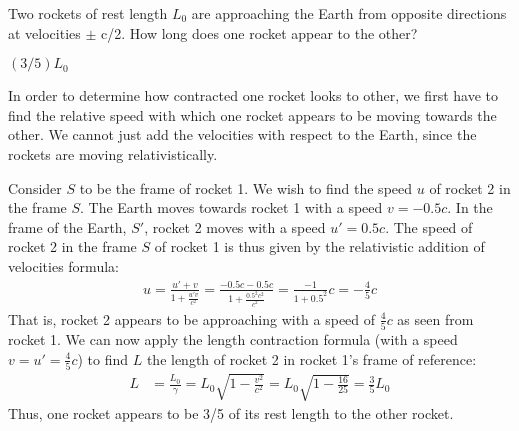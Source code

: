 \question Two rockets of rest length $L_0$ are approaching the Earth from opposite directions at velocities $\pm$ c/2.  How long does one rocket appear to the other?
\begin{finalanswer}
$(3/5)L_0$
\end{finalanswer}
\begin{solution}
In order to determine how contracted one rocket looks to other, we first have to find the relative speed with which one rocket appears to be moving towards the other. We cannot just add the velocities with respect to the Earth, since the rockets are moving relativistically. 

Consider $S$ to be the frame of rocket 1. We wish to find the speed $u$ of rocket 2 in the frame $S$. The Earth moves towards rocket 1 with a speed $v=-0.5c$. In the frame of the Earth, $S'$, rocket 2 moves with a speed $u'=0.5c$. The speed of rocket 2 in the frame $S$ of rocket 1 is thus given by the relativistic addition of velocities formula:
\begin{align*}
u=\frac{u'+v}{1+\frac{u'v}{c^2}}=\frac{-0.5c-0.5c}{1+\frac{0.5^2c^2}{c^2}}=\frac{-1}{1+0.5^2}c=-\frac{4}{5}c
\end{align*}
That is, rocket 2 appears to be approaching with a speed of $\frac{4}{5}c$ as seen from rocket 1. We can now apply the length contraction formula (with a speed $v=u'=\frac{4}{5}c$) to find $L$ the length of rocket 2 in rocket 1's frame of reference:
\begin{align*}
L &= \frac{L_0}{\gamma} =L_0\sqrt{1-\frac{v^2}{c^2}}=L_0\sqrt{1-\frac{16}{25}}= \frac{3}{5}L_0
\end{align*}
Thus, one rocket appears to be 3/5 of its rest length to the other rocket.
\end{solution}

